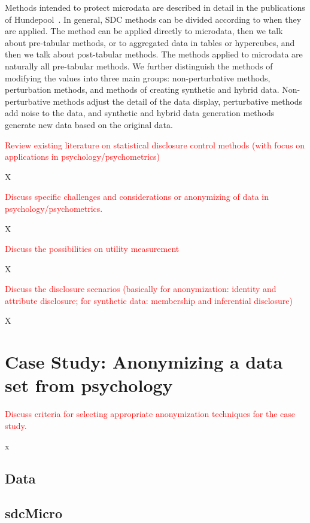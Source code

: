\documentclass{article}
\begin{document}
Methods intended to protect microdata are described in detail in the publications of Hundepool~\cite{2012_Hundepool}. In general, SDC methods can be divided according to when they are applied. The method can be applied directly to microdata, then we talk about pre-tabular methods, or to aggregated data in tables or hypercubes, and then we talk about post-tabular methods. The methods applied to microdata are naturally all pre-tabular methods.
We further distinguish the methods of modifying the values into three main groups: non-perturbative methods, perturbation methods, and methods of creating synthetic and hybrid data. Non-perturbative methods adjust the detail of the data display, perturbative methods add noise to the data, and synthetic and hybrid data generation methods generate new data based on the original data. 
\newline

\textcolor{red}{Review existing literature on statistical disclosure control methods (with focus on applications in psychology/psychometrics)}

X

\textcolor{red}{Discuss specific challenges and considerations or anonymizing of data in psychology/psychometrics.}

X

\textcolor{red}{Discuss the possibilities on utility measurement}

X

\textcolor{red}{Discuss the disclosure scenarios (basically for anonymization: identity and attribute disclosure; for synthetic data: membership and inferential disclosure)}

X

\section{Case Study: Anonymizing a data set from psychology}

\textcolor{red}{Discuss criteria for selecting appropriate anonymization techniques for the case study.}

x

\subsection{Data}

\subsection{sdcMicro}
\end{document}
